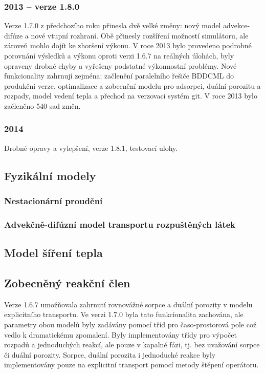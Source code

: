 \documentclass[11pt]{report}
\begin{document}
\subsubsection{2013 -- verze 1.8.0}
Verze 1.7.0 z předchozího roku přinesla dvě velké změny: nový model 
advekce-difúze a nové vtupní rozhraní. Obě přinesly rozšíření možností 
simulátoru, ale zároveň mohlo dojít ke zhoršení výkonu. V roce 2013 bylo 
provedeno podrobné porovnání výsledků a výkonu oproti verzi 1.6.7 na reálných 
úlohách, byly opraveny drobné chyby a vyřešeny podstatné výkonnostní problémy.  
Nové funkcionality zahrnují zejména: začlenění paralelního řešiče BDDCML do 
produkční verze, optimalizace a zobecnění modelu pro adsorpci, duální porozitu a 
rozpady, model vedení tepla a přechod na verzovací systém git. V roce 2013 bylo 
začleněno 540 sad změn.
\subsubsection{2014}
Drobné opravy a vylepšení, verze 1.8.1, testovací ulohy.

\subsection{Fyzikální modely}
\subsubsection{Nestacionární proudění}

\subsubsection{Advekčně-difúzní model transportu rozpuštěných látek}
\label{sc:transport_model}


\subsection{Model šíření tepla}


\subsection{Zobecněný reakční člen}
Verze 1.6.7 umožňovala zahrnutí rovnovážné sorpce a duální porozity v modelu 
explicitního transportu. Ve verzi 1.7.0 byla tato funkcionalita zachována, ale 
parametry obou modelů byly zadávány pomocí tříd pro časo-prostorová pole což 
vedlo k dramatickému zpomalení. Byly implementovány třídy pro výpočet rozpadů a 
jednoduchých reakcí, ale pouze v kapalné fázi, tj. bez uvažování sorpce či 
duální porozity. Sorpce, duální porozita i jednoduché reakce byly implementovány 
pouze na explicitní transport pomocí metody štěpení operátoru. 
\end{document}
